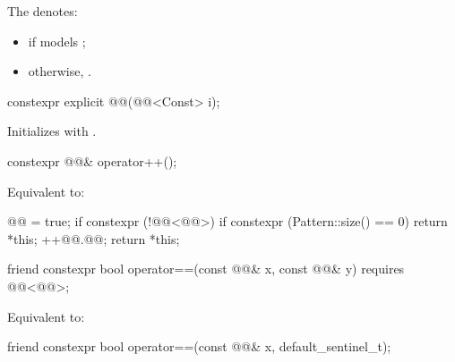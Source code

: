 \pnum
The   denotes:
\begin{itemize}
\item
{} if
 models \linebreak
{};
\item otherwise, .
\end{itemize}

%
\begin{itemdecl}
constexpr explicit @@(@@<Const> i);
\end{itemdecl}

\begin{itemdescr}
\pnum
\effects
Initializes  with .
\end{itemdescr}

%
\begin{itemdecl}
constexpr @@& operator++();
\end{itemdecl}

\begin{itemdescr}
\pnum
\effects
Equivalent to:
\begin{codeblock}
@@ = true;
if constexpr (!@@<@@>) {
  if constexpr (Pattern::size() == 0) {
    return *this;
  }
}
++@@.@@;
return *this;
\end{codeblock}
\end{itemdescr}

%
\begin{itemdecl}
friend constexpr bool operator==(const @@& x, const @@& y)
  requires @@<@@>;
\end{itemdecl}

\begin{itemdescr}
\pnum
\effects
Equivalent to: 
\end{itemdescr}

%
\begin{itemdecl}
friend constexpr bool operator==(const @@& x, default_sentinel_t);
\end{itemdecl}

